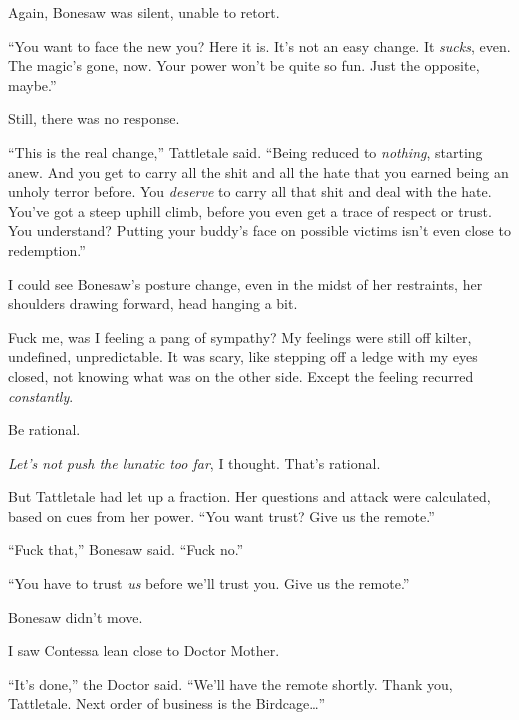 Again, Bonesaw was silent, unable to retort.



``You want to face the new you?  Here it is.  It's not an easy change.  It \emph{sucks}, even.  The magic's gone, now.  Your power won't be quite so fun.  Just the opposite, maybe.''



Still, there was no response.



``This is the real change,'' Tattletale said.  ``Being reduced to \emph{nothing}, starting anew.  And you get to carry all the shit and all the hate that you earned being an unholy terror before.  You \emph{deserve} to carry all that shit and deal with the hate.  You've got a steep uphill climb, before you even get a trace of respect or trust.  You understand?  Putting your buddy's face on possible victims isn't even close to redemption.''



I could see Bonesaw's posture change, even in the midst of her restraints, her shoulders drawing forward, head hanging a bit.



Fuck me, was I feeling a pang of sympathy?  My feelings were still off kilter, undefined, unpredictable.  It was scary, like stepping off a ledge with my eyes closed, not knowing what was on the other side.  Except the feeling recurred \emph{constantly}.



Be rational.



\emph{Let's not push the lunatic too far}, I thought.  That's rational.



But Tattletale had let up a fraction.  Her questions and attack were calculated, based on cues from her power.  ``You want trust?  Give us the remote.''



``Fuck that,'' Bonesaw said.  ``Fuck no.''



``You have to trust \emph{us} before we'll trust you.  Give us the remote.''



Bonesaw didn't move.



I saw Contessa lean close to Doctor Mother.



``It's done,'' the Doctor said.  ``We'll have the remote shortly.  Thank you, Tattletale.  Next order of business is the Birdcage\ldots''



